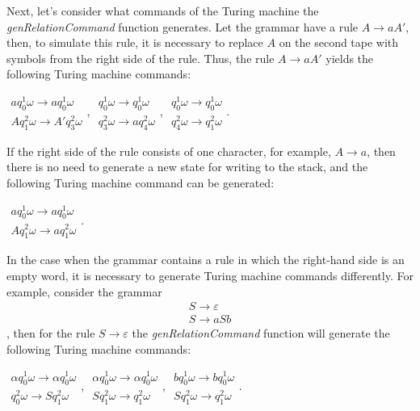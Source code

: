 \documentclass[conference]{IEEEtran}
\theoremstyle{definition}
\begin{document}
Next, let's consider what commands of the Turing machine the \textit{genRelationCommand} function generates.
Let the grammar have a rule $ A \to a A'$, then, to simulate this rule,
it is necessary to replace $ A $ on the second tape with symbols from the right side of the rule. Thus, the rule $ A \to a A'$ yields
the following Turing machine commands:

$\begin{array}{lcl}
    a q_0^1 \omega \to a q_0^1 \omega \\
    A q_1^2 \omega \to A' q_3^2 \omega 
\end{array}$,
$\begin{array}{lcl}
    q_0^1 \omega \to q_0^1 \omega \\
    q_3^2 \omega \to a q_4^2 \omega 
\end{array}$,
$\begin{array}{lcl}
    q_0^1 \omega \to q_0^1 \omega \\
    q_4^2 \omega \to q_1^2 \omega 
\end{array}$. 

If the right side of the rule consists of one character, for example, $ A \to a $, then there is no need to generate a new state for writing to the stack, and the following Turing machine command can be generated:

$\begin{array}{lcl}
    a q_0^1 \omega \to a q_0^1 \omega \\
    A q_1^2 \omega \to a q_1^2 \omega 
\end{array}$. 

In the case when the grammar contains a rule in which the right-hand side is an empty word, it is necessary to generate Turing machine commands differently. For example, consider the grammar
$$\begin{array}{lcl}
    S \to \varepsilon \\
    S \to a S b
\end{array}$$
, then for the rule  $S \to \varepsilon$ the \textit{genRelationCommand} function will generate the following Turing machine commands:

$\begin{array}{lcl}
    \alpha q_0^1 \omega \to \alpha q_0^1 \omega \\
    q_0^2 \omega \to S q_1^2 \omega 
\end{array}$,
$\begin{array}{lcl}
    \alpha q_0^1 \omega \to \alpha q_0^1 \omega \\
    S q_1^2 \omega \to q_1^2 \omega 
\end{array}$,
$\begin{array}{lcl}
    b q_0^1 \omega \to b q_0^1 \omega \\
    S q_1^2 \omega \to q_1^2 \omega 
\end{array}$.
\end{document}

